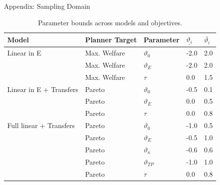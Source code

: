 \documentclass[aspectratio=1610]{beamer}
\begin{document}
\begin{frame}[fragile]{Appendix: Sampling Domain}
\begin{table}[ht!]
\centering
\begin{tabular}{lllll}
\toprule
Model & Planner Target & Parameter & $\underline{\vartheta_i}$ & $\bar{\vartheta_i}$ \\
\midrule
Linear in E & Max. Welfare & $\vartheta_0$     & -2.0   & 2.0   \\
            & Max. Welfare & $\vartheta_E$     & -2.0   & 2.0  \\
           & Max. Welfare & $\tau$         & 0.0  & 1.5  \\
            \midrule
Linear in E + Transfers & Pareto & $\vartheta_0$ & -0.5 & 0.1 \\
                        & Pareto & $\vartheta_E$ & 0.0    & 0.5 \\
                        & Pareto & $\tau$         & 0.0  & 0.8  \\
\midrule
Full linear + Transfers & Pareto & $\vartheta_0$     & -1.0   & 0.5 \\
                        & Pareto & $\vartheta_E$     & -0.5 & 1.0   \\
                        & Pareto & $\vartheta_\kappa$ & -0.6 & 0.6 \\
                        & Pareto & $\vartheta_{TP}$   & -1.0   & 1.0   \\
                        & Pareto & $\tau$         & 0.0  & 0.8  \\
\bottomrule
\end{tabular}
\caption{Parameter bounds across models and objectives. }
\label{tab:param_bounds_main}
\end{table}

\end{frame}

       
\end{document}
